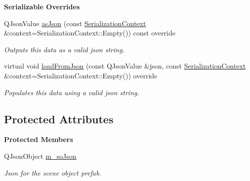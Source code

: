 \begin{Indent}\textbf{ Serializable Overrides}\par
\begin{DoxyCompactItemize}
\item 
\mbox{\label{classrev_1_1_blueprint_a62129b53dac5c59806bee958c435eef0}} 
Q\+Json\+Value \mbox{\hyperlink{classrev_1_1_blueprint_a62129b53dac5c59806bee958c435eef0}{as\+Json}} (const \mbox{\hyperlink{structrev_1_1_serialization_context}{Serialization\+Context}} \&context=Serialization\+Context\+::\+Empty()) const override
\begin{DoxyCompactList}\small\item\em Outputs this data as a valid json string. \end{DoxyCompactList}\item 
\mbox{\label{classrev_1_1_blueprint_a8e1d6de6a890e357c7ab63cd097d6754}} 
virtual void \mbox{\hyperlink{classrev_1_1_blueprint_a8e1d6de6a890e357c7ab63cd097d6754}{load\+From\+Json}} (const Q\+Json\+Value \&json, const \mbox{\hyperlink{structrev_1_1_serialization_context}{Serialization\+Context}} \&context=Serialization\+Context\+::\+Empty()) override
\begin{DoxyCompactList}\small\item\em Populates this data using a valid json string. \end{DoxyCompactList}\end{DoxyCompactItemize}
\end{Indent}
\subsection*{Protected Attributes}
\begin{Indent}\textbf{ Protected Members}\par
\begin{DoxyCompactItemize}
\item 
\mbox{\label{classrev_1_1_blueprint_a9f43cc1f2f5a707dd043747002d4b57a}} 
Q\+Json\+Object \mbox{\hyperlink{classrev_1_1_blueprint_a9f43cc1f2f5a707dd043747002d4b57a}{m\+\_\+so\+Json}}
\begin{DoxyCompactList}\small\item\em Json for the scene object prefab. \end{DoxyCompactList}\end{DoxyCompactItemize}
\end{Indent}
